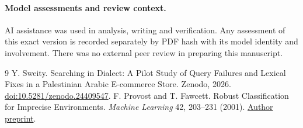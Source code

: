 \documentclass[11pt]{article}
\begin{document}
\paragraph{Model assessments and review context.} AI assistance was used in analysis, writing and verification. Any assessment of this exact version is recorded separately by PDF hash with its model identity and involvement. There was no external peer review in preparing this manuscript.
\begin{thebibliography}{9}
 Y. Sweity. Searching in Dialect: A Pilot Study of Query Failures and Lexical Fixes in a Palestinian Arabic E-commerce Store. Zenodo, 2026. \href{https://doi.org/10.5281/zenodo.24409547}{doi:10.5281/zenodo.24409547}.
 F. Provost and T. Fawcett. Robust Classification for Imprecise Environments. \emph{Machine Learning} 42, 203--231 (2001). \href{https://arxiv.org/abs/cs/0009007}{Author preprint}.
\end{thebibliography}
\end{document}
